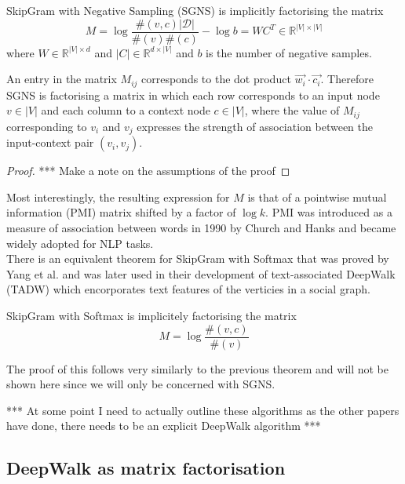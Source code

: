 \documentclass[a4paper]{article}
\begin{document}
\begin{theorem}
  SkipGram with Negative Sampling (SGNS) is implicitly factorising the matrix
  \[M = \log{\frac{\#(v,c)|\mathcal{D}|}{\#(v)\#(c)}} - \log{b} = WC^T\in \mathbb{R}^{|V|
      \times |V|}\]
  where $W \in \mathbb{R}^{|V| \times d}$ and $|C| \in \mathbb{R}^{d \times |V|}$
  and $b$ is the number of negative samples.
\end{theorem}

An entry in the matrix $M_{ij}$ corresponds to the dot product $\vec{w_i} \cdot
\vec{c_i}$. Therefore SGNS is factorising a matrix in which each row corresponds
to an input node $v \in |V|$ and each column to a context node $c \in |V|$,
where the value of $M_{ij}$ corresponding to $v_i$ and $v_j$ expresses the
strength of association between the input-context pair $(v_i, v_j)$.

\begin{proof}

  *** Make a note on the assumptions of the proof

\end{proof}

Most interestingly, the resulting expression for $M$ is that of a pointwise
mutual information (PMI) matrix shifted by a factor of $\log k$. PMI was
introduced as a measure of association between words in 1990 by Church and Hanks
\cite{church1990} and became widely adopted for NLP tasks.\\

There is an equivalent theorem for SkipGram with Softmax that was proved by Yang
et al.\cite{yangalternative2015} and was later used in their development of
text-associated DeepWalk (TADW)\cite{yang2015} which encorporates text features
of the verticies in a social graph.

\begin{theorem}[Yang et al. (2015)]
  SkipGram with Softmax is implicitely factorising the matrix
  \[M = \log{\frac{\#(v,c)}{\#(v)}}\]
\end{theorem}

The proof of this follows very similarly to the previous theorem and will not be
shown here since we will only be concerned with SGNS.



*** At some point I need to actually outline these algorithms as the other
papers have done, there needs to be an explicit DeepWalk algorithm ***

\subsection{DeepWalk as matrix factorisation}
\end{document}
